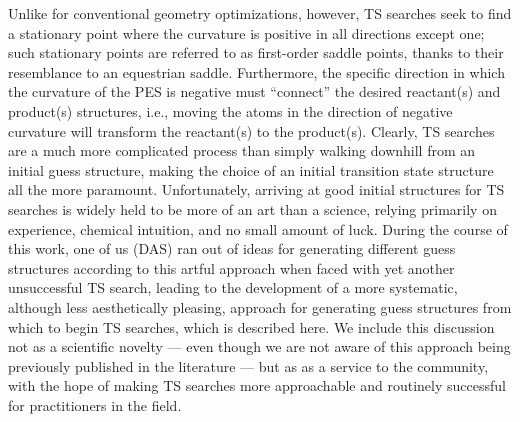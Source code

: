\documentclass[aip,jcp,preprint,superscriptaddress,floatfix]{revtex4-1}
\begin{document}
Unlike for conventional geometry optimizations, however, TS searches seek to
find a stationary point where the curvature is positive in all directions
except one; such stationary points are referred to as first-order saddle
points, thanks to their resemblance to an equestrian saddle.  Furthermore, the
specific direction in which the curvature of the PES is negative must
``connect'' the desired reactant(s) and product(s) structures, i.e., moving the
atoms in the direction of negative curvature will transform the reactant(s) to
the product(s). Clearly, TS searches are a much more complicated process than
simply walking downhill from an initial guess structure, making the choice of
an initial transition state structure all the more paramount.  Unfortunately,
arriving at good initial structures for TS searches is widely held to be more
of an art than a science, relying primarily on experience, chemical intuition,
and no small amount of luck.  During the course of this work, one of us (DAS)
ran out of ideas for generating different guess structures according to this
artful approach when faced with yet another unsuccessful TS search, leading to
the development of a more systematic, although less aesthetically pleasing,
approach for generating guess structures from which to begin TS searches, which
is described here. We include this discussion not as a scientific novelty ---
even though we are not aware of this approach being previously published in the
literature --- but as as a service to the community, with the hope of making TS
searches more approachable and routinely successful for practitioners in the
field.
\end{document}
